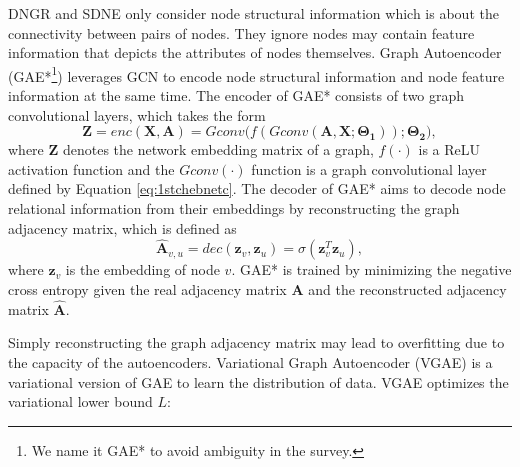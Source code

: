     DNGR \cite{cao2016deep} and SDNE \cite{wang2016sdne} only consider node structural information which is about the connectivity between pairs of nodes. They ignore nodes may contain feature information that depicts the attributes of nodes themselves.  Graph Autoencoder (GAE*\footnote{We name it GAE* to avoid ambiguity in the survey.}) \cite{kipf2016variational} leverages GCN \cite{kipf2017semi} to encode node structural information and node feature information at the same time.  The encoder of GAE* consists of two graph convolutional layers, which takes the form
    \begin{equation}
        \label{eq:gae}
        \mathbf{Z} = enc(\mathbf{X},\mathbf{A}) = Gconv(f(Gconv(\mathbf{A},\mathbf{X};\mathbf{\Theta_1}));\mathbf{\Theta_2)},
    \end{equation}
	where $\mathbf{Z}$ denotes the network embedding matrix of a graph, $f(\cdot)$ is a ReLU activation function and the $Gconv(\cdot)$ function is a graph convolutional layer defined by Equation \ref{eq:1stchebnetc}. The decoder of GAE* aims to decode node relational information from their embeddings by reconstructing the graph adjacency matrix, which is defined as 
	\begin{equation}
	\hat{\mathbf{A}}_{v,u} = dec(\mathbf{z}_v,\mathbf{z}_u) = \sigma(\mathbf{z}_v^T\mathbf{z}_u),
	\end{equation}
	where $\mathbf{z}_v$ is the embedding of node $v$.
	GAE* is trained by minimizing the negative cross entropy given the real adjacency matrix $\mathbf{A}$ and the reconstructed adjacency matrix $\hat{\mathbf{A}}$.
	
    Simply reconstructing the graph adjacency matrix may lead to overfitting due to the capacity of the autoencoders.  Variational Graph Autoencoder (VGAE) \cite{kipf2016variational} is a variational version of GAE to learn the distribution of data. VGAE optimizes the variational lower bound $L$:
	
